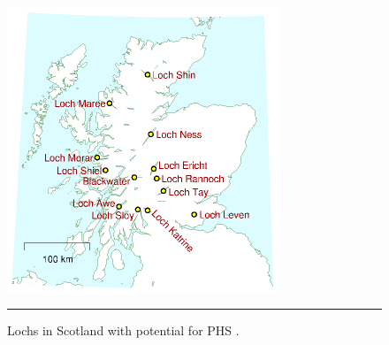 \begin{figure}[htbp]
	\centering
	\includegraphics[width=.5\textwidth]{figures/map_potential_PHS.png}
	\rule{\textwidth}{0.5pt} %
	\caption{Lochs in Scotland with potential for PHS \citep[p.~194]{MacKayDavid2009}.}
	\label{fig:map_potential_PHS}
\end{figure}